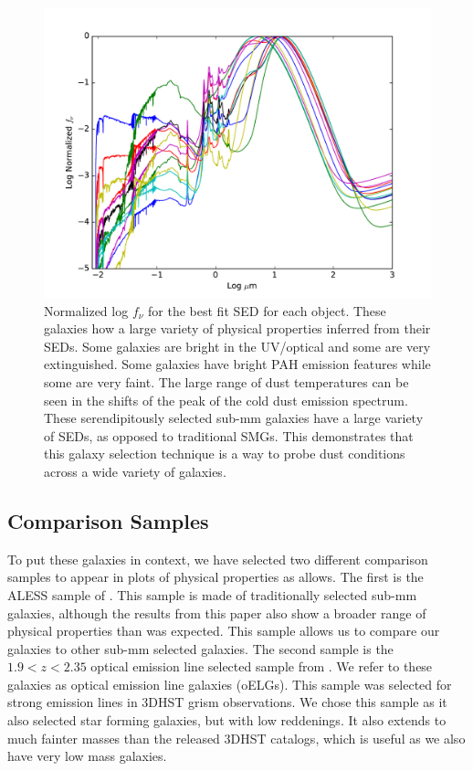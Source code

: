 \documentclass[preprint,natbib209]{aastex}
\begin{document}
\begin{figure}[t]
\centering
\includegraphics[scale=0.8]{all_sed.pdf}
\caption{Normalized log $f_\nu$ for the best fit SED for each object. These galaxies how a large variety of physical properties inferred from their SEDs. Some galaxies are bright in the UV/optical and some are very extinguished. Some galaxies have bright PAH emission features while some are very faint. The large range of dust temperatures can be seen in the shifts of the peak of the cold dust emission spectrum. These serendipitously selected sub-mm galaxies have a large variety of SEDs, as opposed to traditional SMGs. This demonstrates that this galaxy selection technique is a way to probe dust conditions across a wide variety of galaxies.}
\label{fig:allsed}
\end{figure}

\subsection{Comparison Samples}
To put these galaxies in context, we have selected two different comparison samples to appear in plots of physical properties as allows. The first is the ALESS sample of \cite{dacunha15}. This sample is made of traditionally selected sub-mm galaxies, although the results from this paper also show a broader range of physical properties than was expected. This sample allows us to compare our galaxies to other sub-mm selected galaxies.
The second sample is the $1.9 < z < 2.35$ optical emission line selected sample from \cite{zeimann14}. We refer to these galaxies as optical emission line galaxies (oELGs). This sample was selected for strong emission lines in 3DHST grism observations. We chose this sample as it also selected star forming galaxies, but with low reddenings. It also extends to much fainter masses than the released 3DHST catalogs, which is useful as we also have very low mass galaxies. 
\end{document}
